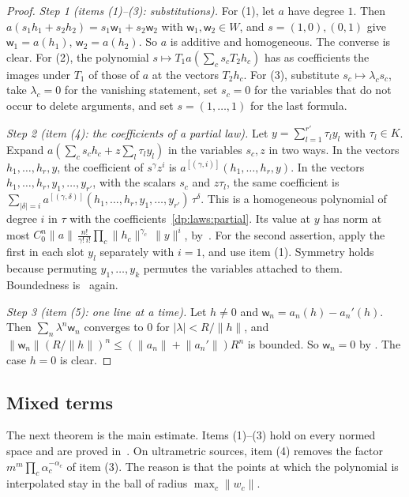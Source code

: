 \documentclass[11pt]{amsart}
\theoremstyle{definition}
\theoremstyle{remark}
\numberwithin{equation}{section}
\newcommand{\abs}[1]{\lvert #1\rvert}
\newcommand{\norm}[1]{\lVert #1\rVert}
\theoremstyle{plain}
\theoremstyle{definition}
\theoremstyle{plain}
\begin{document}
\begin{proof}
\emph{Step 1 (items (1)--(3): substitutions).} For (1), let $a$ have degree $1$. Then $a(s_1h_1+s_2h_2)=s_1\mathsf w_1+s_2\mathsf w_2$ with $\mathsf w_1,\mathsf w_2\in W$, and $s=(1,0),(0,1)$ give $\mathsf w_1=a(h_1)$, $\mathsf w_2=a(h_2)$. So $a$ is additive and homogeneous. The converse is clear. For (2), the polynomial $s\mapsto T_1a(\sum_cs_cT_2h_c)$ has as coefficients the images under $T_1$ of those of $a$ at the vectors $T_2h_c$. For (3), substitute $s_c\mapsto\lambda_cs_c$, take $\lambda_c=0$ for the vanishing statement, set $s_c=0$ for the variables that do not occur to delete arguments, and set $s=(1,\dots,1)$ for the last formula.

\emph{Step 2 (item (4): the coefficients of a partial law).} Let $y=\sum_{l=1}^{r'}\tau_ly_l$ with $\tau_l\in K$. Expand $a(\sum_cs_ch_c+z\sum_l\tau_ly_l)$ in the variables $s_c,z$ in two ways. In the vectors $h_1,\dots,h_r,y$, the coefficient of $s^\gamma z^i$ is $a^{[(\gamma,i)]}(h_1,\dots,h_r,y)$. In the vectors $h_1,\dots,h_r,y_1,\dots,y_{r'}$, with the scalars $s_c$ and $z\tau_l$, the same coefficient is $\sum_{\abs\delta=i}a^{[(\gamma,\delta)]}(h_1,\dots,h_r,y_1,\dots,y_{r'})\,\tau^\delta$. This is a homogeneous polynomial of degree $i$ in $\tau$ with the coefficients~\eqref{dp:laws:partial}. Its value at $y$ has norm at most $C_0^n\norm a\,\frac{n!}{\gamma!\,i!}\prod_c\norm{h_c}^{\gamma_c}\,\norm y^i$, by~\cite[(Q.4)]{I}. For the second assertion, apply the first in each slot $y_l$ separately with $i=1$, and use item (1). Symmetry holds because permuting $y_1,\dots,y_k$ permutes the variables attached to them. Boundedness is~\cite[(Q.4)]{I} again.

\emph{Step 3 (item (5): one line at a time).} Let $h\ne0$ and $\mathsf w_n=a_n(h)-a_n'(h)$. Then $\sum_n\lambda^n\mathsf w_n$ converges to $0$ for $\abs\lambda<R/\norm h$, and $\norm{\mathsf w_n}(R/\norm h)^n\le(\norm{a_n}+\norm{a_n'})R^n$ is bounded. So $\mathsf w_n=0$ by \cite[Lemma~A.1]{I}. The case $h=0$ is clear.
\end{proof}

\subsection{Mixed terms}

The next theorem is the main estimate. Items (1)--(3) hold on every normed space and are proved in~\cite{I}. On ultrametric sources, item (4) removes the factor $m^m\prod_c\alpha_c^{-\alpha_c}$ of item (3). The reason is that the points at which the polynomial is interpolated stay in the ball of radius $\max_c\norm{w_c}$.
\end{document}
